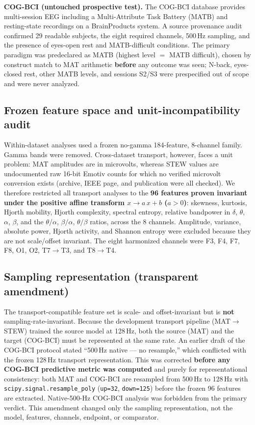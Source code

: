 \documentclass[11pt]{article}
\begin{document}
\textbf{COG-BCI (untouched prospective test).} The COG-BCI database
\cite{hinss2023} provides multi-session EEG including a Multi-Attribute Task
Battery (MATB) and resting-state recordings on a BrainProducts system. A
source provenance audit confirmed 29 readable subjects, the eight required
channels, 500\,Hz sampling, and the presence of eyes-open rest and
MATB-difficult conditions. The primary paradigm was predeclared as MATB
(highest level $=$ MATB difficult), chosen by construct match to MAT arithmetic
\textbf{before} any outcome was seen; N-back, eyes-closed rest, other MATB
levels, and sessions S2/S3 were prespecified out of scope and were never
analyzed.

\subsection{Frozen feature space and unit-incompatibility audit}

Within-dataset analyses used a frozen no-gamma 184-feature, 8-channel family.
Gamma bands were removed. Cross-dataset transport, however, faces a unit
problem: MAT amplitudes are in microvolts, whereas STEW values are undocumented
raw 16-bit Emotiv counts for which no verified microvolt conversion exists
(archive, IEEE page, and publication were all checked). We therefore restricted
all transport analyses to the \textbf{96 features proven invariant under the
positive affine transform $x \rightarrow a\,x + b$ ($a > 0$)}: skewness,
kurtosis, Hjorth mobility, Hjorth complexity, spectral entropy, relative
bandpower in $\delta$, $\theta$, $\alpha$, $\beta$, and the $\theta/\alpha$,
$\beta/\alpha$, $\theta/\beta$ ratios, across the 8 channels. Amplitude,
variance, absolute power, Hjorth activity, and Shannon entropy were excluded
because they are not scale/offset invariant. The eight harmonized channels were
F3, F4, F7, F8, O1, O2, T7$\rightarrow$T3, and T8$\rightarrow$T4.

\subsection{Sampling representation (transparent amendment)}

The transport-compatible feature set is scale- and offset-invariant but is
\textbf{not} sampling-rate-invariant. Because the development transport pipeline
(MAT$\rightarrow$STEW) trained the source model at 128\,Hz, both the source
(MAT) and the target (COG-BCI) must be represented at the same rate. An earlier
draft of the COG-BCI protocol stated ``500\,Hz native --- no resample,'' which
conflicted with the frozen 128\,Hz transport representation. This was corrected
\textbf{before any COG-BCI predictive metric was computed} and purely for
representational consistency: both MAT and COG-BCI are resampled from 500\,Hz to
128\,Hz with \texttt{scipy.signal.resample\_poly} (\texttt{up=32},
\texttt{down=125}) before the frozen 96 features are extracted. Native-500-Hz
COG-BCI analysis was forbidden from the primary verdict. This amendment changed
only the sampling representation, not the model, features, channels, endpoint,
or comparator.
\end{document}
